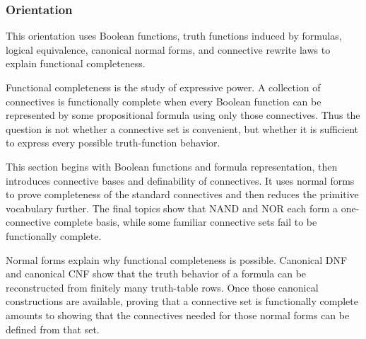 \subsubsection*{Orientation}

\begin{tcolorbox}[
  colback=gray!6,
  colframe=gray!40,
  arc=2pt,
  left=8pt, right=8pt, top=6pt, bottom=6pt,
  title={\small\textbf{Toolkit}},
  fonttitle=\small\bfseries
]
This orientation uses Boolean functions, truth functions induced by formulas,
logical equivalence, canonical normal forms, and connective rewrite laws to
explain functional completeness.
\end{tcolorbox}

\begin{remark*}[Exposition]
Functional completeness is the study of expressive power. A collection of
connectives is functionally complete when every Boolean function can be
represented by some propositional formula using only those connectives. Thus the
question is not whether a connective set is convenient, but whether it is
sufficient to express every possible truth-function behavior.
\end{remark*}

\begin{remark*}
This section begins with Boolean functions and formula representation, then
introduces connective bases and definability of connectives. It uses normal
forms to prove completeness of the standard connectives and then reduces the
primitive vocabulary further. The final topics show that NAND and NOR each form
a one-connective complete basis, while some familiar connective sets fail to be
functionally complete.
\end{remark*}

\begin{remark*}
Normal forms explain why functional completeness is possible. Canonical DNF and
canonical CNF show that the truth behavior of a formula can be reconstructed
from finitely many truth-table rows. Once those canonical constructions are
available, proving that a connective set is functionally complete amounts to
showing that the connectives needed for those normal forms can be defined from
that set.
\end{remark*}
